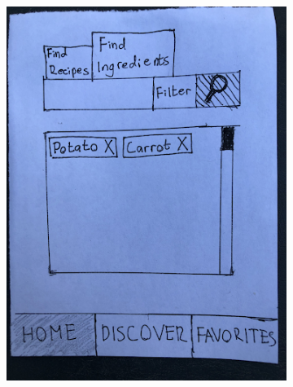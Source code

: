 \documentclass[11pt,english]{article}
\begin{document}
\begin{figure}[H]
  \centering
  \begin{subfigure}[b]{0.4\linewidth}
    \includegraphics[width=\linewidth]{figure9v2.png}
  \end{subfigure}
  \begin{subfigure}[b]{0.4\linewidth}

\end{subfigure}
\end{figure}
\end{document}

